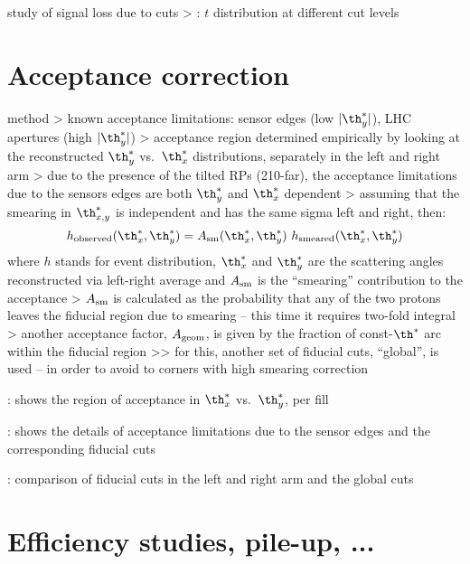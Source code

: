 \> study of signal loss due to cuts
\>> : $t$ distribution at different cut levels



\section{Acceptance correction}

\> method
\>> known acceptance limitations: sensor edges (low $|\th_y^*|$), LHC apertures (high $|\th_y^*|$)
\>> acceptance region determined empirically by looking at the reconstructed $\th_y^*$ vs.~$\th_x^*$ distributions, separately in the left and right arm
\>> due to the presence of the tilted RPs (210-far), the acceptance limitations due to the sensors edges are both $\th_y^*$ and $\th_x^*$ dependent
\>> assuming that the smearing in $\th_{x, y}^*$ is independent and has the same sigma left and right, then:
$$h_{\rm observed}(\th_x^*, \th_y^*) = A_{\rm sm}(\th_x^*, \th_y^*)\ h_{\rm smeared}(\th_x^*, \th_y^*)$$
where $h$ stands for event distribution, $\th_x^*$ and $\th_y^*$ are the scattering angles reconstructed via left-right average and $A_{\rm sm}$ is the ``smearing'' contribution to the acceptance
\>> $A_{\rm sm}$ is calculated as the probability that any of the two protons leaves the fiducial region due to smearing -- this time it requires two-fold integral
\>> another acceptance factor, $A_{\rm geom}$, is given by the fraction of const-$\th^*$ arc within the fiducial region
\>>> for this, another set of fiducial cuts, ``global'', is used -- in order to avoid to corners with high smearing correction

\> : shows the region of acceptance in $\th_x^*$ vs.~$\th_y^*$, per fill

\> : shows the details of acceptance limitations due to the sensor edges and the corresponding fiducial cuts

\> : comparison of fiducial cuts in the left and right arm and the global cuts





\section{Efficiency studies, pile-up, ...}


